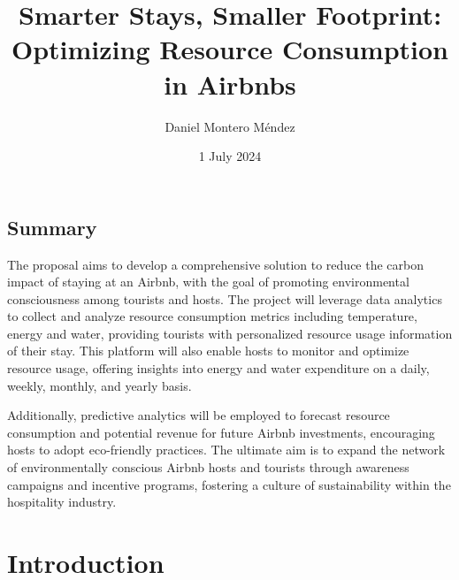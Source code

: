 \documentclass[12pt]{extarticle}
\title{Smarter Stays, Smaller Footprint: Optimizing Resource Consumption in Airbnbs}
\author{Daniel Montero Méndez}
\date{1 July 2024}
\begin{document}
\maketitle

\begin{center}
\section*{Summary}
\end{center}

The proposal aims to develop a comprehensive solution to reduce the carbon impact of staying at an Airbnb, with the goal of promoting environmental consciousness 
among tourists and hosts. The project will leverage data analytics to collect and analyze resource consumption metrics including temperature, energy and water, providing 
tourists with personalized resource usage information of their stay. This platform will also enable hosts to monitor and optimize resource usage, offering insights into energy 
and water expenditure on a daily, weekly, monthly, and yearly basis. 

Additionally, predictive analytics will be employed to forecast resource consumption and potential revenue for future Airbnb investments, encouraging hosts to adopt eco-friendly 
practices. The ultimate aim is to expand the network of environmentally conscious Airbnb hosts and tourists through awareness campaigns and incentive programs, fostering a culture of 
sustainability within the hospitality industry.

\newpage

\tableofcontents

\newpage

\section{Introduction}


\end{document}
